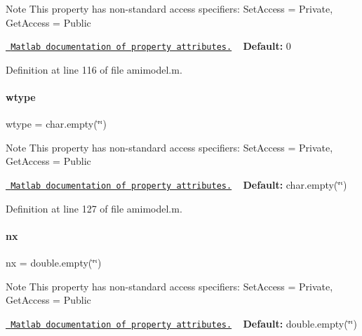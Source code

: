 \begin{DoxyNote}{Note}
This property has non-\/standard access specifiers\+: {\ttfamily Set\+Access = Private, Get\+Access = Public} 

\href{http://www.mathworks.com/help/matlab/matlab_oop/property-attributes.html}{\texttt{ Matlab documentation of property attributes.}} ~\newline
{\bfseries{Default\+:}} 0 
\end{DoxyNote}


Definition at line 116 of file amimodel.\+m.

\mbox{\label{classamimodel_a5376250224ce32fb558d88aa0b5a93ff}} 
\paragraph{\texorpdfstring{wtype}{wtype}}
{\footnotesize\ttfamily wtype = char.\+empty(\char`\"{}\char`\"{})}

\begin{DoxyNote}{Note}
This property has non-\/standard access specifiers\+: {\ttfamily Set\+Access = Private, Get\+Access = Public} 

\href{http://www.mathworks.com/help/matlab/matlab_oop/property-attributes.html}{\texttt{ Matlab documentation of property attributes.}} ~\newline
{\bfseries{Default\+:}} char.\+empty(\char`\"{}\char`\"{}) 
\end{DoxyNote}


Definition at line 127 of file amimodel.\+m.

\mbox{\label{classamimodel_a84e4236f07668a770c27567f1f9615ff}} 
\paragraph{\texorpdfstring{nx}{nx}}
{\footnotesize\ttfamily nx = double.\+empty(\char`\"{}\char`\"{})}

\begin{DoxyNote}{Note}
This property has non-\/standard access specifiers\+: {\ttfamily Set\+Access = Private, Get\+Access = Public} 

\href{http://www.mathworks.com/help/matlab/matlab_oop/property-attributes.html}{\texttt{ Matlab documentation of property attributes.}} ~\newline
{\bfseries{Default\+:}} double.\+empty(\char`\"{}\char`\"{}) 
\end{DoxyNote}


